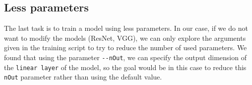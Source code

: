 \documentclass[a4paper]{article}
\def\inline{\lstinline[basicstyle=\ttfamily,keywordstyle={}]}
\begin{document}
\subsection{Less parameters}

The last task is to train a model using less parameters. In our case, if we do not want to modify the models (ResNet, VGG), we can only explore the arguments given in the training script to try to reduce the number of used parameters. We found that using the parameter \inline{--nOut}, we can specify the output dimension of the \inline{linear layer} of the model, so the goal would be in this case to reduce this \inline{nOut} parameter rather than using the default value.


\printbibliography
\end{document}
